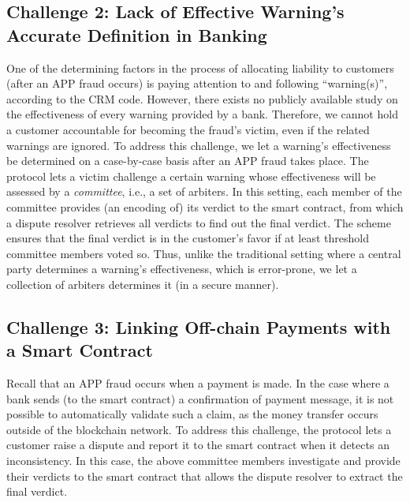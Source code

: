 \vspace{-1.5mm}
\subsection{Challenge 2: Lack of Effective Warning's Accurate Definition in Banking}\label{sec::Lack-of-Effective-Warning-Definition}

One of the determining  factors in the process of allocating liability to  customers (after an APP fraud occurs) is paying attention to and following ``warning(s)'', according to the CRM code. However, there exists  no  publicly available study  on the  effectiveness of every warning  provided by  a bank. Therefore, we cannot hold a customer accountable for becoming the fraud's victim,  even if the related warnings are ignored.    To address this challenge, we let a warning's effectiveness be determined on a case-by-case basis after an APP fraud takes place. The protocol lets  a victim   challenge a certain warning whose effectiveness will be assessed by a \emph{committee}, i.e., a  set of arbiters. In this setting, each member of the  committee provides (an encoding of) its verdict to the smart contract, from which a dispute resolver retrieves all verdicts to find out the final verdict. The scheme ensures that the final verdict is  in the customer's favor if at least threshold  committee members voted so. Thus, unlike the traditional setting where a central party determines a warning's effectiveness, which is error-prone, we let a collection of arbiters   determines it (in a secure manner).



\vspace{-2mm}
\subsection{Challenge 3: Linking Off-chain Payments with a Smart Contract}\label{sec::Linking Off-chain-Payments-with-contract}
 Recall that an APP fraud occurs when a payment is made. In the case where a  bank  sends  (to the smart contract) a confirmation of payment message, it is not possible to automatically validate such a claim, as the money  transfer occurs  outside of the blockchain network. To address this challenge, the protocol lets a customer raise a dispute and report it to the smart contract when it detects an inconsistency. In this case, the above committee members investigate and provide their  verdicts to the smart contract that allows the dispute resolver to extract the final verdict. 


